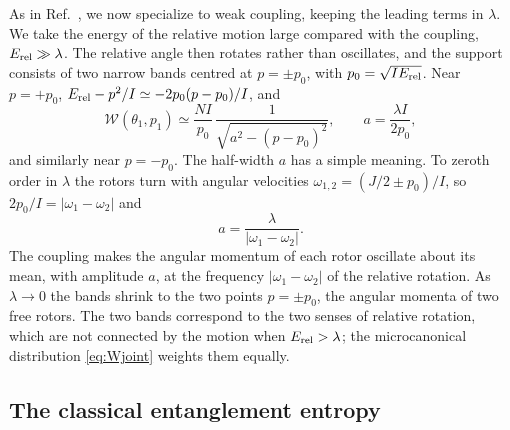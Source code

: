 \documentclass[aps,preprint,12pt,superscriptaddress,nofootinbib]{revtex4-2}
\newcommand{\Erel}{E_{\rm rel}}
\newcommand{\Wc}{\mathcal{W}}
\begin{document}
As in Ref.~\cite{DKS}, we now specialize to weak coupling, keeping the leading terms
in $\lambda$. We take the energy of the relative motion large compared with the
coupling, $\Erel\gg\lambda$. The relative angle then rotates rather than oscillates,
and the support consists of two narrow bands centred at $p=\pm p_{0}$, with
$p_{0}=\sqrt{I\Erel}$. Near $p=+p_{0}$,
$\Erel-p^{2}/I\simeq-2p_{0}(p-p_{0})/I$, and
\begin{equation}
\Wc(\theta_{1},p_{1})\simeq\frac{NI}{p_{0}}\,
\frac{1}{\sqrt{a^{2}-(p-p_{0})^{2}}},\qquad a=\frac{\lambda I}{2p_{0}},
\label{eq:Warcsine}
\end{equation}
and similarly near $p=-p_{0}$. The half-width $a$ has a simple meaning. To zeroth
order in $\lambda$ the rotors turn with angular velocities
$\omega_{1,2}=(J/2\pm p_{0})/I$, so $2p_{0}/I=|\omega_{1}-\omega_{2}|$ and
\begin{equation}
a=\frac{\lambda}{|\omega_{1}-\omega_{2}|}.
\label{eq:a}
\end{equation}
The coupling makes the angular momentum of each rotor oscillate about its mean, with
amplitude $a$, at the frequency $|\omega_{1}-\omega_{2}|$ of the relative rotation.
As $\lambda\to0$ the bands shrink to the two points $p=\pm p_{0}$, the angular
momenta of two free rotors. The two bands correspond to the two senses of relative
rotation, which are not connected by the motion when $\Erel>\lambda$; the
microcanonical distribution \eqref{eq:Wjoint} weights them equally.

\subsection{The classical entanglement entropy}
\label{sec:SCE}
\end{document}
